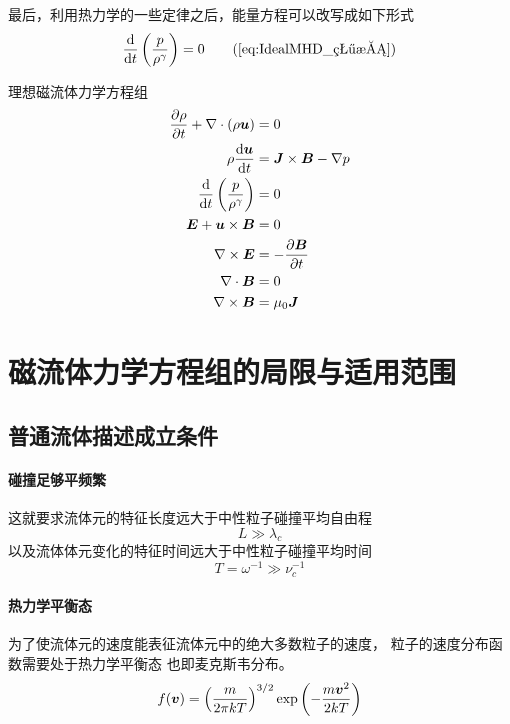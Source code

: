 最后，利用热力学的一些定律之后，能量方程可以改写成如下形式
\begin{equation}
\Deriv{}{t} \left(\frac{p}{\rho^\gamma}\right) = 0 \tag{\ref{eq:IdealMHD_状态}}
\end{equation}

理想磁流体力学方程组
\begin{subequations}\begin{align}
\frac{\partial {\rho}}{\partial {t}} + \nabla \cdot {\left(\rho \bm{u}\right)} &= 0 \label{eq:IdealMHD_质量}\\
\rho \frac{\mathop{}\!\mathrm{d} {\bm{u}}}{\mathop{}\!\mathrm{d} {t}} &= \bm{J} \times \bm{B} - \nabla {p} \label{eq:IdealMHD_动量}\\
\frac{\mathop{}\!\mathrm{d} {}}{\mathop{}\!\mathrm{d} {t}} \left(\frac{p}{\rho^\gamma}\right) &= 0 \label{eq:IdealMHD_状态}\\
\bm{E} + \bm{u} \times \bm{B} &= 0 \label{eq:IdealMHD_欧姆}\\
\nabla \times {\bm{E}} &= - \frac{\partial {\bm{B}}}{\partial {t}} \label{eq:IdealMHD_电场}\\
\nabla \cdot {\bm{B}} &= 0 \label{eq:IdealMHD_磁场}\\
\nabla \times {\bm{B}} &= \mu_0 \bm{J} \label{eq:IdealMHD_电流}
\end{align}\end{subequations}

\section{磁流体力学方程组的局限与适用范围}

\subsection{普通流体描述成立条件}

\paragraph{碰撞足够平频繁}
这就要求流体元的特征长度远大于中性粒子碰撞平均自由程
\begin{equation}
L \gg \lambda_c
\end{equation}
以及流体体元变化的特征时间远大于中性粒子碰撞平均时间
\begin{equation}
T = \omega^{-1} \gg \nu_c^{-1}
\end{equation}

\paragraph{热力学平衡态}
为了使流体元的速度能表征流体元中的绝大多数粒子的速度，
粒子的速度分布函数需要处于热力学平衡态 也即麦克斯韦分布。
\begin{equation}
f(\bm{v}) = \left(\frac{m}{2 \pi k T}\right)^{3/2}
\exp{\left(-\frac{m \bm{v}^2}{2 k T}\right)}
\end{equation}

